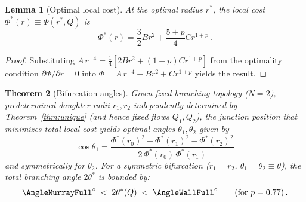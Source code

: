 \documentclass[11pt,a4paper]{article}
\newtheorem{theorem}{Theorem}
\newtheorem{lemma}[theorem]{Lemma}
\theoremstyle{remark}
\begin{document}
\begin{lemma}[Optimal local cost]
\label{lem:cost_opt}
At the optimal radius $r^*$, the local cost $\Phi^*(r) \equiv \Phi(r^*, Q)$ is
\begin{equation}
  \Phi^*(r) = \frac{3}{2}B r^2 + \frac{5+p}{4}C r^{1+p}\,.
  \label{eq:phi_star}
\end{equation}
\end{lemma}
\begin{proof}
Substituting $A\, r^{-4} = \frac{1}{4}[2B r^2 + (1+p)C r^{1+p}]$ from the
optimality condition $\partial\Phi/\partial r = 0$ into $\Phi = A\,r^{-4} + B
r^2 + C r^{1+p}$ yields the result.
\end{proof}

\begin{theorem}[Bifurcation angles]
\label{thm:angles}
Given fixed branching topology ($N=2$), predetermined daughter radii $r_1, r_2$
independently determined by Theorem~\ref{thm:unique} (and hence fixed flows
$Q_1, Q_2$), the junction position that minimizes total local cost yields
optimal angles $\theta_1, \theta_2$ given by
\begin{equation}
  \cos\theta_1 = \frac{\Phi^*(r_0)^2 + \Phi^*(r_1)^2 - \Phi^*(r_2)^2}{2\,\Phi^*(r_0)\,\Phi^*(r_1)}
\end{equation}
and symmetrically for $\theta_2$.
For a symmetric bifurcation ($r_1=r_2$, $\theta_1=\theta_2\equiv\theta$), the
total branching angle $2\theta^*$ is bounded by:
\begin{equation}
  \AngleMurrayFull^\circ \;<\; 2\theta^*(Q) \;<\; \AngleWallFull^\circ \qquad (\text{for } p=0.77)\,.
\end{equation}
\end{theorem}
\end{document}
